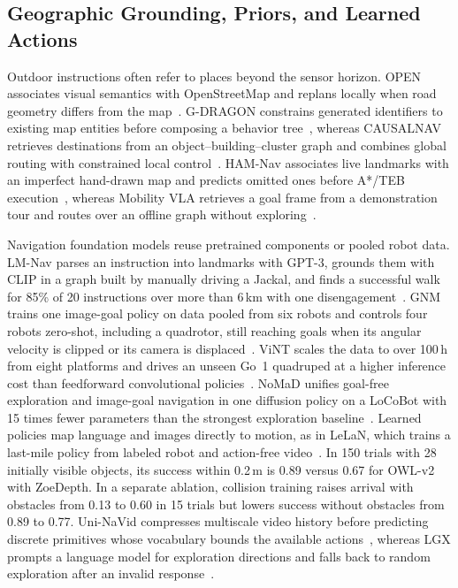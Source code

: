 \subsection{Geographic Grounding, Priors, and Learned Actions}

Outdoor instructions often refer to places beyond the sensor horizon. OPEN associates visual semantics with OpenStreetMap and replans locally when road geometry differs from the map~\cite{P_M10}. G-DRAGON constrains generated identifiers to existing map entities before composing a behavior tree~\cite{P_E46}, whereas CAUSALNAV retrieves destinations from an object--building--cluster graph and combines global routing with constrained local control~\cite{P_E45}. HAM-Nav associates live landmarks with an imperfect hand-drawn map and predicts omitted ones before A*/TEB execution~\cite{P_S39}, whereas Mobility VLA retrieves a goal frame from a demonstration tour and routes over an offline graph without exploring~\cite{P_S43}.

Navigation foundation models reuse pretrained components or pooled robot data. LM-Nav parses an instruction into landmarks with GPT-3, grounds them with CLIP in a graph built by manually driving a Jackal, and finds a successful walk for 85\% of 20 instructions over more than 6\,km with one disengagement~\cite{P_K12}. GNM trains one image-goal policy on data pooled from six robots and controls four robots zero-shot, including a quadrotor, still reaching goals when its angular velocity is clipped or its camera is displaced~\cite{P_K13}. ViNT scales the data to over 100\,h from eight platforms and drives an unseen Go~1 quadruped at a higher inference cost than feedforward convolutional policies~\cite{P_K14}. NoMaD unifies goal-free exploration and image-goal navigation in one diffusion policy on a LoCoBot with 15 times fewer parameters than the strongest exploration baseline~\cite{P_K16}. Learned policies map language and images directly to motion, as in LeLaN, which trains a last-mile policy from labeled robot and action-free video~\cite{P_E50}. In 150 trials with 28 initially visible objects, its success within 0.2\,m is 0.89 versus 0.67 for OWL-v2 with ZoeDepth. In a separate ablation, collision training raises arrival with obstacles from 0.13 to 0.60 in 15 trials but lowers success without obstacles from 0.89 to 0.77. Uni-NaVid compresses multiscale video history before predicting discrete primitives whose vocabulary bounds the available actions~\cite{P_E49}, whereas LGX prompts a language model for exploration directions and falls back to random exploration after an invalid response~\cite{P_M20}.

